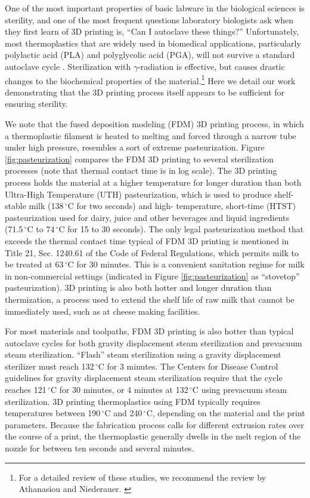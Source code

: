 \documentclass[fleqn,10pt]{wlpeerj}
\begin{document}
One of the most important properties of basic labware in the biological
sciences is sterility, and one of the most frequent questions laboratory
biologists ask when they first learn of 3D printing is, ``Can I autoclave
these things?'' Unfortunately, most thermoplastics that are widely used in
biomedical applications, particularly polylactic acid (PLA) and polyglycolic
acid (PGA), will not survive a standard autoclave cycle
\cite{steam_sterilization_PLA}. Sterilization with $\gamma$-radiation is
effective, but causes drastic changes to the biochemical properties of the
material.\footnote{For a detailed review of these studies, we recommend the
review by Athanasiou and Niederauer. \cite{pla_suture_review}}
\cite{gama_radiation_PLA} Here we detail our work demonstrating that the 3D
printing process itself appears to be sufficient for ensuring sterility.

We note that the fused deposition modeling (FDM) 3D printing process, in which
a thermoplastic filament is heated to melting and forced through a narrow tube
under high pressure, resembles a sort of extreme pasteurization. Figure
\ref{fig:pasteurization} compares the FDM 3D printing to several sterilization
processes (note that thermal contact time  is in log scale). The 3D printing
process holds the material at a higher temperature for longer duration than
both Ultra-High Temperature (UTH) pasteurization, which is used to produce
shelf-stable milk (138$\,^{\circ}\mathrm{C}$ for two seconds) and high-
temperature, short-time (HTST) pasteurization used for dairy, juice and other
beverages and liquid ingredients (71.5$\,^{\circ}\mathrm{C}$ to
74$\,^{\circ}\mathrm{C}$ for 15 to 30 seconds). The only legal pasteurization
method that exceeds the thermal contact time typical of FDM 3D printing is
mentioned in Title 21, Sec. 1240.61 of the Code of Federal Regulations, which
permits milk to be treated at 63$\,^{\circ}\mathrm{C}$ for 30 minutes. This is
a convenient sanitation regime for milk in non-commercial settings (indicated
in Figure \ref{fig:pasteurization} as ``stovetop'' pasteurization). 3D
printing is also both hotter and longer duration than thermization, a process
used to extend the shelf life of raw milk that cannot be immediately used,
such as at cheese making facilities.

For most materials and toolpaths, FDM 3D printing is also hotter than typical
autoclave cycles for both gravity displacement steam sterilization and
prevacuum steam sterilization. ``Flash'' steam sterilization using a gravity
displacement sterilizer must reach 132$\,^{\circ}\mathrm{C}$ for 3 minutes.
The Centers for Disease Control guidelines for gravity displacement steam
sterilization require that the cycle reaches 121$\,^{\circ}\mathrm{C}$ for 30
minutes, or 4 minutes at 132$\,^{\circ}\mathrm{C}$ using prevacuum steam
sterilization. 3D printing thermoplastics using FDM typically requires
temperatures between 190$\,^{\circ}\mathrm{C}$ and 240$\,^{\circ}\mathrm{C}$,
depending on the material and the print parameters. Because the fabrication
process calls for different  extrusion rates over the course of a print, the
thermoplastic  generally dwells in the melt region of the nozzle for between
ten seconds and several minutes.
\end{document}
